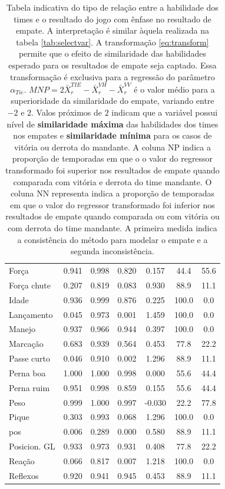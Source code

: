 \documentclass[doc,apacite,oneside,a4paper,12pt]{apa6}
\begin{document}
\begin{table}[ht]
\begin{small}
\begin{tabular}{l||rrr||cc|||c}
\rowcolor{gray!10!} Força & 0.941 & 0.998 & 0.820 & 0.157 & 44.4 & 55.6 \\ 
\rowcolor{gray!30!} Força chute & 0.207 & 0.819 & 0.083 & 0.930 & 88.9 & 11.1 \\ 
\rowcolor{gray!10!} Idade & 0.936 & 0.999 & 0.876 & 0.225 & 100.0 & 0.0 \\ 
\rowcolor{gray!30!} Lançamento & 0.045 & 0.973 & 0.001 & 1.459 & 100.0 & 0.0 \\ 
\rowcolor{gray!10!} Manejo & 0.937 & 0.966 & 0.944 & 0.397 & 100.0 & 0.0 \\ 
\rowcolor{gray!30!} Marcação & 0.683 & 0.939 & 0.564 & 0.453 & 77.8 & 22.2 \\ 
\rowcolor{gray!10!} Passe curto & 0.046 & 0.910 & 0.002 & 1.296 & 88.9 & 11.1 \\ 
\rowcolor{gray!30!} Perna boa & 1.000 & 1.000 & 0.998 & 0.000 & 55.6 & 44.4 \\ 
\rowcolor{gray!10!} Perna ruim & 0.951 & 0.998 & 0.859 & 0.155 & 55.6 & 44.4 \\ 
\rowcolor{gray!30!} Peso & 0.999 & 1.000 & 0.997 & -0.030 & 22.2 & 77.8 \\ 
\rowcolor{gray!10!} Pique & 0.303 & 0.993 & 0.068 & 1.296 & 100.0 & 0.0 \\ 
\rowcolor{gray!30!} pos & 0.006 & 0.289 & 0.000 & 0.580 & 88.9 & 11.1 \\ 
\rowcolor{gray!10!} Posicion. GL & 0.933 & 0.973 & 0.931 & 0.408 & 77.8 & 22.2 \\ 
\rowcolor{gray!30!} Reação & 0.066 & 0.817 & 0.007 & 1.218 & 100.0 & 0.0 \\ 
\rowcolor{gray!10!} Reflexos & 0.920 & 0.941 & 0.945 & 0.453 & 88.9 & 11.1 \\ 
   \hline
\end{tabular}
\end{small}
\caption[\scriptsize{Variable selection with transformation.}]{\scriptsize{ Tabela indicativa do tipo de relação entre a habilidade dos times e o resultado do jogo com ênfase no resultado de empate. A interpretação é similar àquela realizada na tabela \ref{tab:selectvar}. A transformação \ref{eq:transform} permite que o efeito de similaridade das habilidades esperado para os resultados de empate seja captado. Essa transformação é exclusiva para a regressão do parâmetro $\alpha_{Tie}$. $ MNP = 2  \bar{X}_r^{TIE} - \bar{X}_r^{VH} - \bar{X}_r^{VV}$ é o valor médio para a superioridade da similaridade do empate, variando entre $-2$ e $2$. Valos próximos de $2$ indicam que a variável possui nível de \textbf{similaridade máxima} das habilidades dos times nos empates e \textbf{similaridade mínima} para os casos de vitória ou derrota do mandante. A coluna NP indica a proporção de temporadas em que o o valor do regressor transformado foi superior nos resultados de empate quando comparada com vitória e derrota do time mandante. O coluna NN representa indica a proporção de temporadas em que o valor do regressor transformado foi inferior nos resultados de empate quando comparada ou com vitória ou com derrota do time mandante. A primeira medida indica a  consistência do método para modelar o empate e a segunda inconsistência.}}

\end{table}
\end{document}
